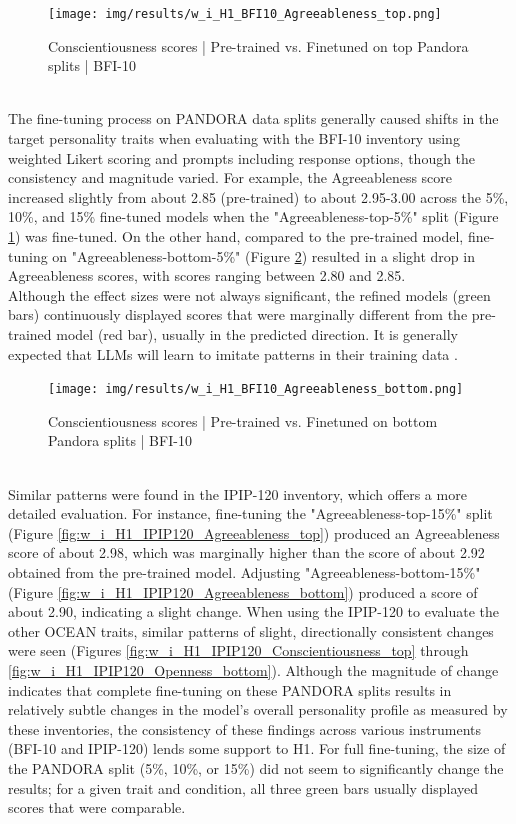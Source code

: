 \documentclass{DESSThesis}
\begin{document}
\begin{figure}[H]
    \centering
    \texttt{[image: img/results/w\_i\_H1\_BFI10\_Agreeableness\_top.png]}
    \caption{Conscientiousness scores | Pre-trained vs. Finetuned on top Pandora splits | BFI-10}
    \label{fig:w_i_H1_BFI10_Agreeableness_top}
\end{figure}
\\
The fine-tuning process on PANDORA data splits generally caused shifts in the target personality traits when evaluating with the BFI-10 inventory using weighted Likert scoring and prompts including response options, though the consistency and magnitude varied. For example, the Agreeableness score increased slightly from about 2.85 (pre-trained) to about 2.95-3.00 across the 5\%, 10\%, and 15\% fine-tuned models when the "Agreeableness-top-5\%" split (Figure \ref{fig:w_i_H1_BFI10_Agreeableness_top}) was fine-tuned. On the other hand, compared to the pre-trained model, fine-tuning on "Agreeableness-bottom-5\%" (Figure \ref{fig:w_i_H1_BFI10_Agreeableness_bottom}) resulted in a slight drop in Agreeableness scores, with scores ranging between 2.80 and 2.85.
\\
Although the effect sizes were not always significant, the refined models (green bars) continuously displayed scores that were marginally different from the pre-trained model (red bar), usually in the predicted direction. It is generally expected that LLMs will learn to imitate patterns in their training data \cite{jiang_evaluating_2023, pan_llms_2023, safdari_personality_2023}.

\begin{figure}[H]
    \centering
    \texttt{[image: img/results/w\_i\_H1\_BFI10\_Agreeableness\_bottom.png]}
    \caption{Conscientiousness scores | Pre-trained vs. Finetuned on bottom Pandora splits | BFI-10}
    \label{fig:w_i_H1_BFI10_Agreeableness_bottom}
\end{figure}

\\
Similar patterns were found in the IPIP-120 inventory, which offers a more detailed evaluation. For instance, fine-tuning the "Agreeableness-top-15\%" split (Figure \ref{fig:w_i_H1_IPIP120_Agreeableness_top}) produced an Agreeableness score of about 2.98, which was marginally higher than the score of about 2.92 obtained from the pre-trained model. Adjusting "Agreeableness-bottom-15\%" (Figure \ref{fig:w_i_H1_IPIP120_Agreeableness_bottom}) produced a score of about 2.90, indicating a slight change. When using the IPIP-120 to evaluate the other OCEAN traits, similar patterns of slight, directionally consistent changes were seen (Figures \ref{fig:w_i_H1_IPIP120_Conscientiousness_top} through \ref{fig:w_i_H1_IPIP120_Openness_bottom}). Although the magnitude of change indicates that complete fine-tuning on these PANDORA splits results in relatively subtle changes in the model's overall personality profile as measured by these inventories, the consistency of these findings across various instruments (BFI-10 and IPIP-120) lends some support to H1. For full fine-tuning, the size of the PANDORA split (5\%, 10\%, or 15\%) did not seem to significantly change the results; for a given trait and condition, all three green bars usually displayed scores that were comparable.
\end{document}
